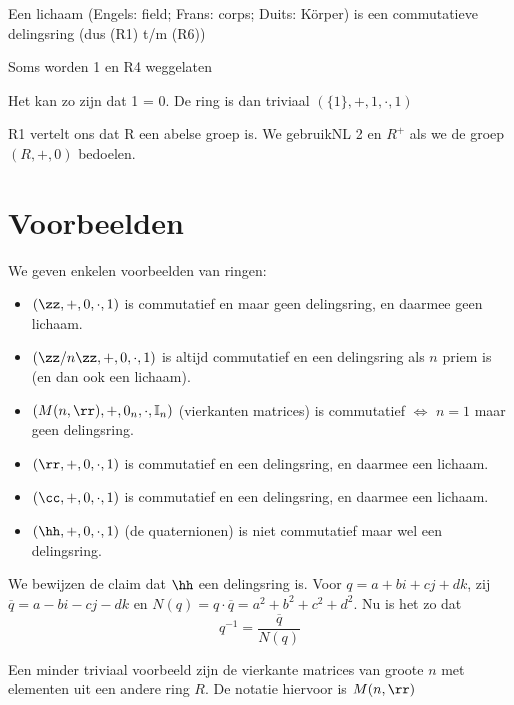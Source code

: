 \documentclass[a4paper,12pt,oneside]{book}
\begin{document}
\begin{definitie}
Een lichaam (Engels: field; Frans: corps; Duits: Körper) is een commutatieve delingsring (dus (R1)
t/m (R6))
\end{definitie}

\begin{opmerking}
Soms worden 1 en R4 weggelaten
\end{opmerking}

\begin{opmerking}
Het kan zo zijn dat 1 = 0. De ring is dan triviaal $(\{1\}, +, 1, \cdot, 1)$
\end{opmerking}

\begin{opmerking}
R1 vertelt ons dat R een abelse groep is. We gebruikNL
2
en $R^+$ als we de groep $(R,+,0)$ bedoelen.
\end{opmerking}

\section{Voorbeelden}
\begin{voorbeeld}
We geven enkelen voorbeelden van ringen:
\begin{itemize}
	\item $(\zz, +, 0, \cdot, 1)$ is commutatief en maar geen delingsring, en daarmee geen lichaam.
	\item $(\zz/n\zz, +, 0, \cdot, 1)$ is altijd commutatief en een delingsring als $n$ priem is (en dan ook een lichaam).
	\item $(M(n,\rr), +, 0_n, \cdot, \mathbb{I}_n)$ (vierkanten matrices) is commutatief $\iff$ $n=1$ maar geen delingsring.
	\item $(\rr, +, 0, \cdot, 1)$ is commutatief en een delingsring, en daarmee een lichaam.
	\item $(\cc, +, 0, \cdot, 1)$ is commutatief en een delingsring, en daarmee een lichaam.
	\item $(\hh, +, 0, \cdot, 1)$ (de quaternionen) is niet commutatief maar wel een delingsring.
\end{itemize}
\end{voorbeeld}

We bewijzen de claim dat $\hh$ een delingsring is. Voor $q = a + bi + cj + dk$, zij $\overline{q} = a - bi - cj - dk$ en $N(q) = q \cdot \overline{q} = a^2 + b^2 + c^2 +d^2$. Nu is het zo dat
\[
q^{-1} = \frac{\overline{q}}{N(q)}
\]


\begin{voorbeeld}
Een minder triviaal voorbeeld zijn de vierkante matrices van groote $n$ met elementen uit een andere ring $R$. De notatie hiervoor is $M(n,\rr)$
\end{voorbeeld}
\end{document}
